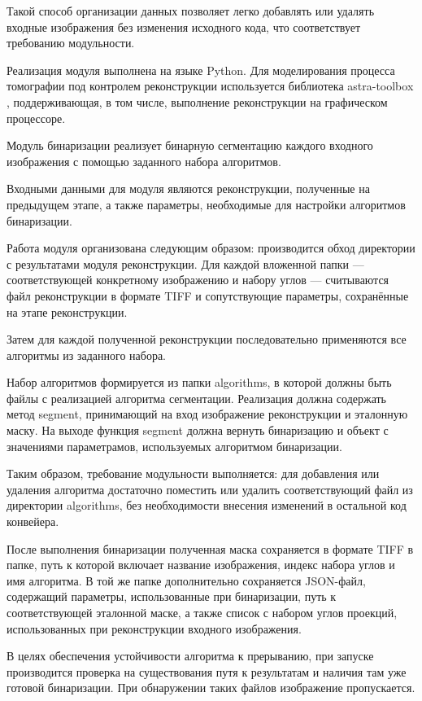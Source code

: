 Такой способ организации данных позволяет легко добавлять или удалять входные изображения без изменения исходного кода, что соответствует требованию модульности.

Реализация модуля выполнена на языке Python. Для моделирования процесса томографии под контролем реконструкции используется библиотека astra-toolbox \cite{van2016fast}, поддерживающая, в том числе, выполнение реконструкции на графическом процессоре.

Модуль бинаризации реализует бинарную сегментацию каждого входного изображения с помощью заданного набора алгоритмов.

Входными данными для модуля являются реконструкции, полученные на предыдущем этапе, а также параметры, необходимые для настройки алгоритмов бинаризации.

Работа модуля организована следующим образом: производится обход директории с результатами модуля реконструкции. Для каждой вложенной папки — соответствующей конкретному изображению и набору углов — считываются файл реконструкции в формате TIFF и сопутствующие параметры, сохранённые на этапе реконструкции.

Затем для каждой полученной реконструкции последовательно применяются все алгоритмы из заданного набора.

Набор алгоритмов формируется из папки algorithms, в которой должны быть файлы с реализацией алгоритма сегментации. Реализация должна содержать метод segment, принимающий на вход изображение реконструкции и эталонную маску. На выходе функция segment должна вернуть бинаризацию и объект с значениями параметрамов, используемых алгоритмом бинаризации. 

Таким образом, требование модульности выполняется: для добавления или удаления алгоритма достаточно поместить или удалить соответствующий файл из директории algorithms, без необходимости внесения изменений в остальной код конвейера.

После выполнения бинаризации полученная маска сохраняется в формате TIFF в папке, путь к которой включает название изображения, индекс набора углов и имя алгоритма. В той же папке дополнительно сохраняется JSON-файл, содержащий параметры, использованные при бинаризации, путь к соответствующей эталонной маске, а также список с набором углов проекций, использованных при реконструкции входного изображения.

В целях обеспечения устойчивости алгоритма к прерыванию, при запуске производится проверка на существования путя к результатам и наличия там уже готовой бинаризации. При обнаружении таких файлов изображение пропускается. 

